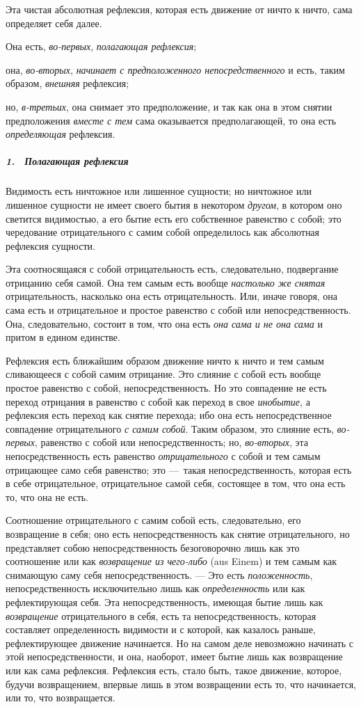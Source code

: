 Эта чистая абсолютная рефлексия, которая есть движение от ничто к ничто,
сама определяет себя далее.

Она есть, {\em во-первых},
{\em полагающая рефлексия};

она, {\em во-вторых}, {\em начинает
с предположенного непосредственного} и есть, таким образом,
{\em внешняя} рефлексия;

но, {\em в-третьих}, она снимает это предположение, и
так как она в этом снятии предположения {\em вместе с
тем} сама оказывается предполагающей, то она есть
{\em определяющая} рефлексия.

\subparagraph[1. \ Полагающая рефлексия]{1. \ Полагающая рефлексия}
Видимость есть ничтожное или лишенное сущности;
но ничтожное или лишенное сущности не имеет своего бытия в некотором
{\em другом}, в котором оно светится видимостью, а его
бытие есть его собственное равенство с собой; это чередование
отрицательного с самим собой определилось как абсолютная рефлексия
сущности.

Эта соотносящаяся с собой отрицательность есть, следовательно, подвергание
отрицанию себя самой. Она тем самым есть вообще
{\em настолько же снятая} отрицательность, насколько
она есть отрицательность. Или, иначе говоря, она сама есть и отрицательное
и простое равенство с собой или непосредственность. Она, следовательно,
состоит в том, что она есть {\em она сама и не она
сама} и притом в едином единстве.

Рефлексия есть ближайшим образом движение ничто к ничто и тем самым
сливающееся с собой самим отрицание. Это слияние с собой есть вообще
простое равенство с собой, непосредственность. Но это совпадение не есть
переход отрицания в равенство с собой как переход в свое
{\em инобытие}, а рефлексия есть переход как снятие
перехода; ибо она есть непосредственное совпадение отрицательного
{\em с самим собой}. Таким образом, это слияние есть,
{\em во-первых}, равенство с собой или
непосредственность; но, {\em во-вторых}, эта
непосредственность есть равенство {\em отрицательного}
с собой и тем самым отрицающее само себя равенство; это —~такая
непосредственность, которая есть в себе отрицательное, отрицательное самой
себя, состоящее в том, что она есть то, что она не есть.

Соотношение отрицательного с самим собой есть, следовательно, его
возвращение в себя; оно есть непосредственность как снятие отрицательного,
но представляет собою непосредственность безоговорочно лишь как это
соотношение или как {\em возвращение из чего-либо} (aus
Einem) и тем самым как снимающую саму себя непосредственность. — Это есть
{\em положенность}, непосредственность исключительно
лишь как {\em определенность} или как рефлектирующая
себя. Эта непосредственность, имеющая бытие лишь как
{\em возвращение} отрицательного в себя, есть та
непосредственность, которая составляет определенность видимости и с
которой, как казалось раньше, рефлектирующее движение начинается. Но на
самом деле невозможно начинать с этой непосредственности, и она, наоборот,
имеет бытие лишь как возвращение или как сама рефлексия. Рефлексия есть,
стало быть, такое движение, которое, будучи возвращением, впервые лишь в
этом возвращении есть то, что начинается, или то, что возвращается.

